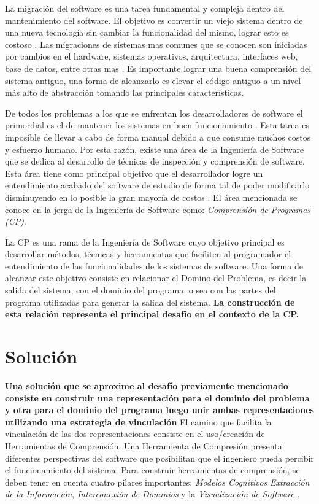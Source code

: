 \documentclass[12pt]{report}
\begin{document}
La migración del software es una tarea fundamental y compleja dentro del mantenimiento del software. El objetivo es convertir un viejo sistema dentro de una nueva tecnología sin cambiar la funcionalidad del mismo, lograr esto es costoso \cite{WHAFVR11}. Las migraciones de sistemas mas comunes que se conocen son iniciadas por cambios en el hardware, sistemas operativos, arquitectura, interfaces web, base de datos, entre otras mas \cite{MMFAF07}. Es importante lograr una buena comprensión del sistema antiguo, una forma de alcanzarlo es elevar el código antiguo a un nivel más alto de abstracción tomando las principales características.

De todos los problemas a los que se enfrentan los desarrolladores de software el primordial es el de mantener los sistemas en buen funcionamiento \cite{VMAVA95}. 
Esta tarea es imposible de llevar a cabo de forma manual debido a que consume muchos costos y esfuerzo humano. 
Por esta razón, existe una área de la Ingeniería de Software que se  
dedica al desarrollo de técnicas de inspección y comprensión de software. 
Esta área tiene como principal objetivo que el desarrollador logre un entendimiento 
acabado del software de estudio de forma tal de poder modificarlo disminuyendo en lo posible la gran mayoría de costos \cite{BRM10}. 
El área mencionada se conoce en la jerga de la Ingeniería de Software como: \textit{Comprensión de Programas (CP)}.

La CP es una rama de la Ingeniería de Software cuyo objetivo 
principal es desarrollar métodos, técnicas y herramientas que faciliten al programador 
el entendimiento de las funcionalidades de los sistemas de software.
Una forma de alcanzar este objetivo consiste en relacionar el Domino del Problema, 
es decir la salida del sistema, con el dominio del programa, o sea 
con las partes del programa utilizadas para generar la salida del sistema.
\textbf{La construcción de esta relación representa el principal desafío en el contexto de la CP.}



\section{Solución}

\textbf{Una solución que se aproxime al desafío previamente mencionado consiste en construir una representación para el dominio del problema y otra para el dominio del programa luego unir ambas representaciones utilizando una estrategia de vinculación} 
El camino que facilita la vinculación de las dos representaciones consiste en el uso/creación de Herramientas de Comprensión. 
Una Herramienta de Compresión presenta diferentes perspectivas del software que posibilitan que el ingeniero pueda percibir el funcionamiento del sistema. 
Para construir herramientas de comprensión, se deben tener en cuenta cuatro pilares importantes: \textit{Modelos Cognitivos}
\textit{Extracción de la Información},
\textit{Interconexión de Dominios} y la
\textit{Visualización de Software} \cite{STOREY99,BROOK82}.
\end{document}
